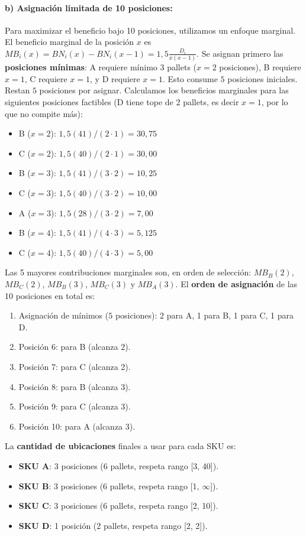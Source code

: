 \documentclass[11pt]{article}
\begin{document}
\paragraph{b) Asignación limitada de 10 posiciones:}
Para maximizar el beneficio bajo 10 posiciones, utilizamos un enfoque marginal. 
El beneficio marginal de la posición $x$ es $MB_i(x) = BN_i(x) - BN_i(x-1) = 1,5 \frac{D_i}{x(x-1)}$.
Se asignan primero las \textbf{posiciones mínimas}: 
A requiere mínimo 3 pallets ($x=2$ posiciones), B requiere $x=1$, C requiere $x=1$, y D requiere $x=1$. Esto consume $5$ posiciones iniciales.
Restan $5$ posiciones por asignar. Calculamos los beneficios marginales para las siguientes posiciones factibles (D tiene tope de 2 pallets, es decir $x=1$, por lo que no compite más):
\begin{itemize}
    \item B ($x=2$): $1,5(41)/(2\cdot 1) = 30,75$
    \item C ($x=2$): $1,5(40)/(2\cdot 1) = 30,00$
    \item B ($x=3$): $1,5(41)/(3\cdot 2) = 10,25$
    \item C ($x=3$): $1,5(40)/(3\cdot 2) = 10,00$
    \item A ($x=3$): $1,5(28)/(3\cdot 2) = 7,00$
    \item B ($x=4$): $1,5(41)/(4\cdot 3) = 5,125$
    \item C ($x=4$): $1,5(40)/(4\cdot 3) = 5,00$
\end{itemize}
Las 5 mayores contribuciones marginales son, en orden de selección: $MB_B(2)$, $MB_C(2)$, $MB_B(3)$, $MB_C(3)$ y $MB_A(3)$.
El \textbf{orden de asignación} de las 10 posiciones en total es:
\begin{enumerate}
    \item Asignación de mínimos ($5$ posiciones): 2 para A, 1 para B, 1 para C, 1 para D.
    \item Posición 6: para B (alcanza 2).
    \item Posición 7: para C (alcanza 2).
    \item Posición 8: para B (alcanza 3).
    \item Posición 9: para C (alcanza 3).
    \item Posición 10: para A (alcanza 3).
\end{enumerate}

La \textbf{cantidad de ubicaciones} finales a usar para cada SKU es:
\begin{itemize}
    \item \textbf{SKU A}: 3 posiciones (6 pallets, respeta rango [3, 40]).
    \item \textbf{SKU B}: 3 posiciones (6 pallets, respeta rango [1, $\infty$]).
    \item \textbf{SKU C}: 3 posiciones (6 pallets, respeta rango [2, 10]).
    \item \textbf{SKU D}: 1 posición (2 pallets, respeta rango [2, 2]).
\end{itemize}
\end{document}
